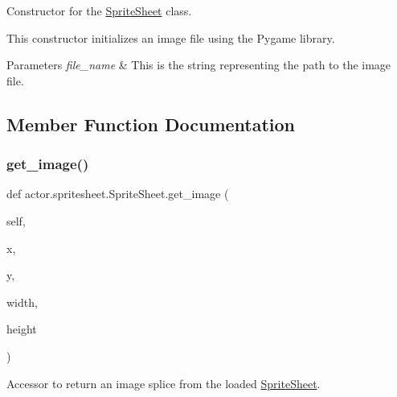 Constructor for the \hyperlink{classactor_1_1spritesheet_1_1_sprite_sheet}{Sprite\+Sheet} class. 

This constructor initializes an image file using the Pygame library. 
\begin{DoxyParams}{Parameters}
{\em file\+\_\+name} & This is the string representing the path to the image file. \\
\hline
\end{DoxyParams}


\subsection{Member Function Documentation}
\mbox{\label{classactor_1_1spritesheet_1_1_sprite_sheet_ad2c4f5b00c63a9377b64fe28ef26587b}} 
\subsubsection{\texorpdfstring{get\+\_\+image()}{get\_image()}}
{\footnotesize\ttfamily def actor.\+spritesheet.\+Sprite\+Sheet.\+get\+\_\+image (\begin{DoxyParamCaption}\item[{}]{self,  }\item[{}]{x,  }\item[{}]{y,  }\item[{}]{width,  }\item[{}]{height }\end{DoxyParamCaption})}



Accessor to return an image splice from the loaded \hyperlink{classactor_1_1spritesheet_1_1_sprite_sheet}{Sprite\+Sheet}. 

